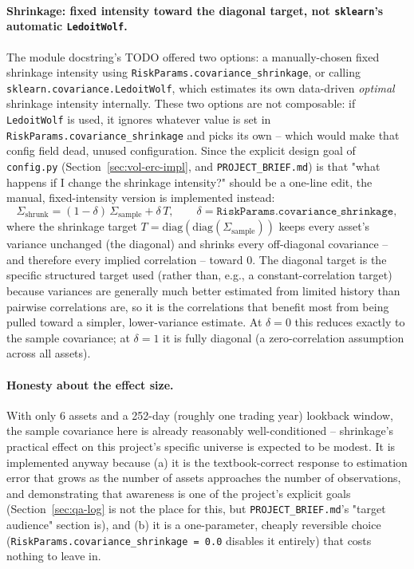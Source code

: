 \documentclass[11pt]{article}
\begin{document}
\paragraph{Shrinkage: fixed intensity toward the diagonal target, not
\texttt{sklearn}'s automatic \texttt{LedoitWolf}.} The module docstring's
TODO offered two options: a manually-chosen fixed shrinkage intensity
using \texttt{RiskParams.covariance\_shrinkage}, or calling
\texttt{sklearn.covariance.LedoitWolf}, which estimates its own
data-driven \emph{optimal} shrinkage intensity internally. These two
options are not composable: if \texttt{LedoitWolf} is used, it ignores
whatever value is set in \texttt{RiskParams.covariance\_shrinkage} and
picks its own -- which would make that config field dead, unused
configuration. Since the explicit design goal of \texttt{config.py}
(Section~\ref{sec:vol-erc-impl}, and \texttt{PROJECT\_BRIEF.md}) is that
"what happens if I change the shrinkage intensity?" should be a
one-line edit, the manual, fixed-intensity version is implemented
instead:
\[
\Sigma_{\text{shrunk}} = (1-\delta)\, \Sigma_{\text{sample}} + \delta\, T,
\qquad \delta = \texttt{RiskParams.covariance\_shrinkage},
\]
where the shrinkage target $T = \mathrm{diag}(\mathrm{diag}(\Sigma_{\text{sample}}))$
keeps every asset's variance unchanged (the diagonal) and shrinks every
off-diagonal covariance -- and therefore every implied correlation --
toward 0. The diagonal target is the specific structured target used
(rather than, e.g., a constant-correlation target) because variances are
generally much better estimated from limited history than pairwise
correlations are, so it is the correlations that benefit most from being
pulled toward a simpler, lower-variance estimate. At $\delta=0$ this
reduces exactly to the sample covariance; at $\delta=1$ it is fully
diagonal (a zero-correlation assumption across all assets).

\paragraph{Honesty about the effect size.} With only 6 assets and a
252-day (roughly one trading year) lookback window, the sample covariance
here is already reasonably well-conditioned -- shrinkage's practical
effect on this project's specific universe is expected to be modest. It
is implemented anyway because (a) it is the textbook-correct response to
estimation error that grows as the number of assets approaches the
number of observations, and demonstrating that awareness is one of the
project's explicit goals (Section~\ref{sec:qa-log} is not the place for
this, but \texttt{PROJECT\_BRIEF.md}'s "target audience" section is), and
(b) it is a one-parameter, cheaply reversible choice
(\texttt{RiskParams.covariance\_shrinkage = 0.0} disables it entirely)
that costs nothing to leave in.
\end{document}
